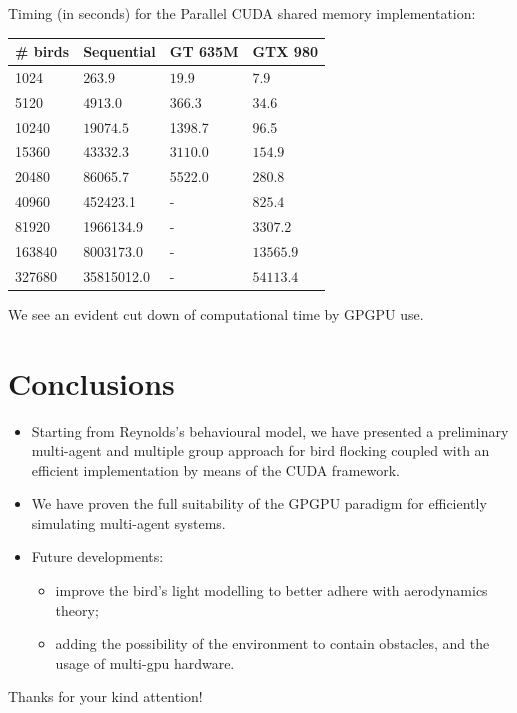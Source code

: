 \documentclass{beamer}
\begin{document}

\begin{frame}
Timing (in seconds) for the Parallel CUDA shared memory implementation:
\begin{table} [h!]
	\centering
	\begin{tabular}{|l |l |l| l|}
	\hline
	\# birds & Sequential & GT	635M & GTX 980
	\\
	\hline
	

	1024  & \(263.9\) & $19.9$ & $7.9$  \\
	5120  & \(4913.0\) & $366.3$ & $34.6$  \\
	10240 &  $19074.5$ & 1398.7 & 96.5  \\
	15360  & \(43332.3\) & $3110.0$ & $154.9$  \\
	20480  & 86065.7 & 5522.0 & $280.8$ \\
	40960  & 452423.1 & - & $825.4$ \\
	81920  & 1966134.9 & - & $3307.2$ \\
	163840  & 8003173.0 & - & $13565.9$ \\
	327680  & 35815012.0 & - & $54113.4$  \\
	\hline
	\end{tabular}
	\label{tab:ifdiv}
\end{table}
We see an evident cut down of computational time by GPGPU use.
\end{frame}
\section{Conclusions}
\begin{frame}
\begin{itemize}
\item Starting from Reynolds's behavioural model, we have 
presented a preliminary multi-agent and multiple group approach for bird flocking coupled with an efficient implementation by means of the CUDA framework.
\item We have proven the full suitability of the GPGPU paradigm for efficiently simulating multi-agent systems.
\item Future developments:
\begin{itemize}
\item improve the bird's light modelling to better adhere with aerodynamics theory;
\item adding the possibility of the environment to contain obstacles, and the usage of multi-gpu hardware.
\end{itemize}
\end{itemize}
\end{frame}

\begin{frame}
\begin{center}
\begin{huge}Thanks for your kind attention! \end{huge}
\end{center}

\end{frame}
\end{document}
